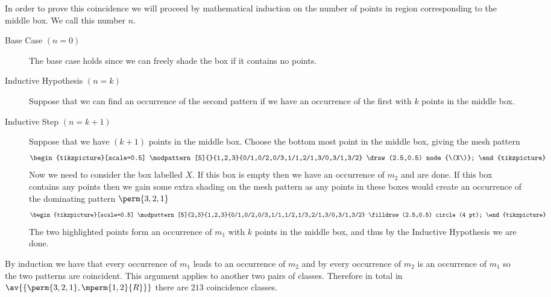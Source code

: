 In order to prove this coincidence we will proceed by mathematical
induction on the number of points in region corresponding to the middle box.
We call this number \(n\).
\begin{description}
    \item [Base Case \((n=0)\)] The base case holds since we can freely shade the
        box if it contains no points.
    \item [Inductive Hypothesis \((n=k)\)] Suppose that we can find an occurrence
        of the second pattern if we have an occurrence of the first with \(k\) points
        in the middle box.
    \item [Inductive Step \((n=k+1)\)] Suppose that we have \((k+1)\) points in
        the middle box. Choose the bottom most point in the middle box, giving the
        mesh pattern
     \begin{equation*}
        \begin{tikzpicture}[scale=0.5]
            \modpattern[5]{}{1,2,3}{0/1,0/2,0/3,1/1,2/1,3/0,3/1,3/2}
            \draw (2.5,0.5) node {\(X\)};
        \end{tikzpicture}
    \end{equation*}
        Now we need to consider the box labelled \(X\). If this box is empty then
        we have an occurrence of \(m_2\) and are done. If this box contains
        any points then we gain some extra shading on the mesh pattern
        as any points in these boxes would create an occurrence of the dominating pattern \(\perm{3,2,1}\)
     \begin{equation*}
        \begin{tikzpicture}[scale=0.5]
            \modpattern[5]{2,3}{1,2,3}{0/1,0/2,0/3,1/1,1/2,1/3,2/1,3/0,3/1,3/2}
            \filldraw (2.5,0.5) circle (4 pt);
        \end{tikzpicture}
    \end{equation*}
        The two highlighted points form an occurrence of \(m_1\) with \(k\)
        points in the middle box, and thus by the Inductive Hypothesis we
        are done.
\end{description}
By induction we have that every occurrence of \(m_1\) leads to an occurrence of \(m_2\)
and by  every occurrence of \(m_2\) is an occurrence of
\(m_1\) so the two patterns are coincident.
This argument applies to another two pairs of classes. Therefore in
total in \(\av{\{\perm{3,2,1}, \mperm{1,2}{R}\}}\) there are \(213\) coincidence
classes.
